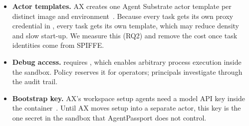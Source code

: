 \begin{warnbox}
\begin{itemize}
  \item \textbf{Actor templates.} AX creates one Agent Substrate actor template per distinct image and environment~\cite{ax-runner}. Because every task gets its own proxy credential in , every task gets its own template, which may reduce density and slow start-up. We measure this (RQ2) and remove the cost once task identities come from SPIFFE.
  \item \textbf{Debug access.}  requires , which enables arbitrary process execution inside the sandbox. Policy reserves it for operators; principals investigate through the audit trail.
  \item \textbf{Bootstrap key.} AX's workspace setup agents need a model API key inside the container~\cite{ax-sandbox}. Until AX moves setup into a separate actor, this key is the one secret in the sandbox that AgentPassport does not control.
\end{itemize}
\end{warnbox}
